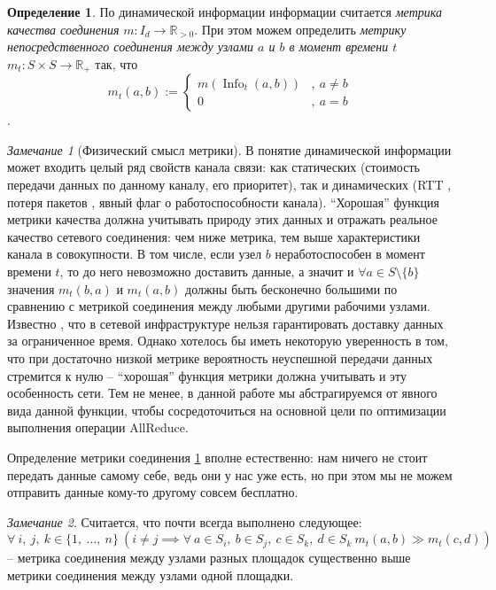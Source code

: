 \documentclass{article}
\theoremstyle{plain}
\theoremstyle{plain}
\theoremstyle{plain}
\theoremstyle{plain}
\theoremstyle{definition}
\newtheorem{definition}{Определение}[section]
\theoremstyle{remark}
\newtheorem{remark}{Замечание}[section]
\theoremstyle{plain}
\DeclareMathOperator*{\info}{Info}
\begin{document}
\begin{definition}
\label{MetricDefinition}
    По динамической информации информации считается \textit{метрика качества соединения} $m: I_d \to \mathbb{R}_{>0}$. При этом можем определить \textit{метрику непосредственного соединения между узлами $a$ и $b$ в момент времени $t$} $m_t: S \times S \to \mathbb{R}_+$ так, что
    \[ m_t(a, b) :=
      \begin{cases}
        m(\info_t(a, b)) &,\ a \neq b \\
        0 &,\ a = b
      \end{cases}
    \].
\end{definition}

\begin{remark}[Физический смысл метрики]
\label{MetricPhysicalMeaning}
    В понятие динамической информации может входить целый ряд свойств канала связи: как статических (стоимость передачи данных по данному каналу, его приоритет), так и динамических (RTT \cite{definition:round-trip_delay_time}, потеря пакетов \cite{RFC1242}, явный флаг о работоспособности канала). \enquote{Хорошая} функция метрики качества должна учитывать природу этих данных и отражать реальное качество сетевого соединения: чем ниже метрика, тем выше характеристики канала в совокупности. В том числе, если узел $b$ неработоспособен в момент времени $t$, то до него невозможно доставить данные, а значит и $\forall a \in S \setminus \{ b \}$ значения $m_t(b, a)$ и $m_t(a, b)$ должны быть бесконечно большими по сравнению с метрикой соединения между любыми другими рабочими узлами. Известно \cite{networking:best-effort-service}, что в сетевой инфраструктуре нельзя гарантировать доставку данных за ограниченное время. Однако хотелось бы иметь некоторую уверенность в том, что при достаточно низкой метрике вероятность неуспешной передачи данных стремится к нулю -- \enquote{хорошая} функция метрики должна учитывать и эту особенность сети. Тем не менее, в данной работе мы абстрагируемся от явного вида данной функции, чтобы сосредоточиться на основной цели по оптимизации выполнения операции AllReduce.
\end{remark}

Определение метрики соединения \ref{MetricDefinition} вполне естественно: нам ничего не стоит передать данные самому себе, ведь они у нас уже есть, но при этом мы не можем отправить данные кому-то другому совсем бесплатно.

\begin{remark}
\label{MetricEmpiricalRule}
    Считается, что почти всегда выполнено следующее: 
    \[
        \forall\ i,\ j,\ k \in \{1,\ \ldots,\ n\}\ ( i \neq j \implies \forall\ a \in S_i,\ b \in S_j,\ c \in S_k,\ d \in S_k\ m_t(a, b) \gg m_t(c, d))
    \] -- метрика соединения между узлами разных площадок существенно выше метрики соединения между узлами одной площадки.
\end{remark}
\end{document}
